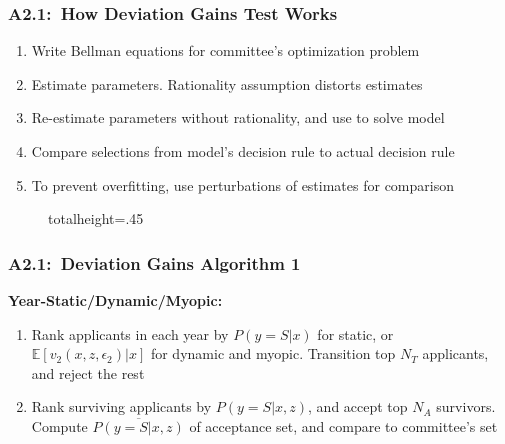 \documentclass[12pt, aspectratio=169]{beamer}
\begin{document}
\begin{frame}[label=hdgtw]
\frametitle{A2.1:\ How Deviation Gains Test Works}
\begin{enumerate}
\item Write Bellman equations for committee's optimization problem
\vspace{1.25pt}
\item Estimate parameters. Rationality assumption distorts estimates
\vspace{1.25pt}
\item Re-estimate parameters without rationality, and use to solve model
\vspace{1.25pt}
\item Compare selections from model's decision rule to actual decision rule
\vspace{1.25pt}
\item To prevent overfitting, use perturbations of estimates for comparison
\vspace{1.25pt}
\end{enumerate}
\begin{figure}
\begin{adjustbox}{totalheight=.45\textheight}

\end{adjustbox}
\end{figure}
\vspace{-5pt}
\hyperlink{dgi}{}
\end{frame}

\begin{frame}[label=dga1]
\frametitle{A2.1:\ Deviation Gains Algorithm 1}
\textbf{Year-Static/Dynamic/Myopic:}
\vspace{10pt}
\begin{enumerate}
\item Rank applicants in each year by $P(y=S|x)$ for static, or $\mathbb{E}[v_2(x,z,\epsilon_2)|x]$ for dynamic and myopic. Transition top $N_T$ applicants, and reject the rest
\vspace{5pt}
\item Rank surviving applicants by $P(y=S|x,z)$, and accept top $N_A$ survivors. \\ Compute $\overline{P(y=S|x,z)}$ of acceptance set, and compare to committee's set
\end{enumerate}
\vspace{10pt}
\hyperlink{dgi}{}
\end{frame}
\end{document}
